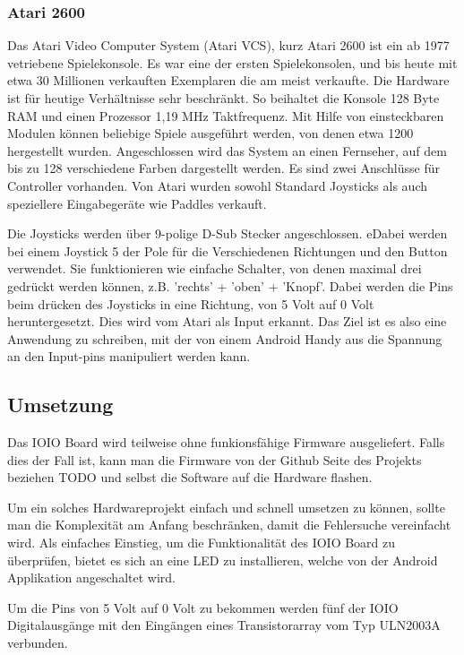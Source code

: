\documentclass[12pt,journal,compsoc]{IEEEtran}
\begin{document}
\subsubsection{Atari 2600}
Das Atari Video Computer System (Atari VCS), kurz Atari 2600 ist ein ab 1977 vetriebene Spielekonsole. 
Es war eine der ersten Spielekonsolen, und bis heute mit etwa 30 Millionen verkauften Exemplaren die am meist verkaufte.
Die Hardware ist für heutige Verhältnisse sehr beschränkt. 
So beihaltet die Konsole 128 Byte RAM und einen Prozessor 1,19 MHz Taktfrequenz.
Mit Hilfe von einsteckbaren Modulen können beliebige Spiele ausgeführt werden, von denen etwa 1200 hergestellt wurden.
Angeschlossen wird das System an einen Fernseher, auf dem bis zu 128 verschiedene Farben dargestellt werden.
Es sind zwei Anschlüsse für Controller vorhanden. Von Atari wurden sowohl Standard Joysticks als auch speziellere Eingabegeräte wie Paddles verkauft.

Die Joysticks werden über 9-polige D-Sub Stecker angeschlossen.
eDabei werden bei einem Joystick 5 der Pole für die Verschiedenen Richtungen und den Button verwendet.
Sie funktionieren wie einfache Schalter, von denen maximal drei gedrückt werden können, z.B. 'rechts' + 'oben' + 'Knopf'.
Dabei werden die Pins beim drücken des Joysticks in eine Richtung, von 5 Volt auf 0 Volt heruntergesetzt. 
Dies wird vom Atari als Input erkannt.
Das Ziel ist es also eine Anwendung zu schreiben, mit der von einem Android Handy aus die Spannung an den Input-pins manipuliert werden kann.

\subsection{Umsetzung}
Das IOIO Board wird teilweise ohne funkionsfähige Firmware ausgeliefert. Falls dies der Fall ist, kann man die Firmware von der Github Seite des Projekts beziehen TODO und selbst die Software auf die Hardware flashen.

Um ein solches Hardwareprojekt einfach und schnell umsetzen zu können, sollte man die Komplexität am Anfang beschränken, damit die Fehlersuche vereinfacht wird.
Als einfaches Einstieg, um die Funktionalität des IOIO Board zu überprüfen, bietet es sich an eine LED zu installieren, welche von der Android Applikation angeschaltet wird.

Um die Pins von 5 Volt auf 0 Volt zu bekommen werden fünf der IOIO Digitalausgänge mit den Eingängen eines Transistorarray vom Typ ULN2003A verbunden.
\end{document}
